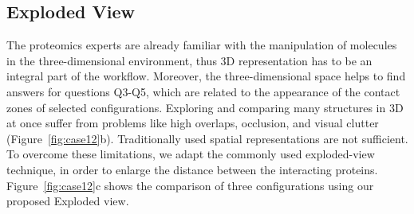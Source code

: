 \documentclass{bmcart}
\def\ExpView {Exploded view\xspace}
\def\MatView {Matrix view\xspace}
\begin{document}









\subsection*{Exploded View}
The proteomics experts are already familiar with the manipulation of molecules in the three-dimensional environment, thus 3D representation has to be an integral part of the workflow.
Moreover, the three-dimensional space helps to find answers for questions Q3-Q5, which are related to the appearance of the contact zones of selected configurations.
Exploring and comparing many structures in 3D at once suffer from problems like high overlaps, occlusion, and visual clutter (Figure~\ref{fig:case12}b). 
Traditionally used spatial representations are not sufficient.
To overcome these limitations, we adapt the commonly used exploded-view technique, in order to enlarge the distance between the interacting proteins. 
Figure~\ref{fig:case12}c shows the comparison of three configurations using our proposed \ExpView.
\end{document}
